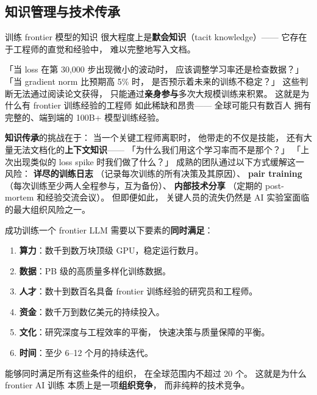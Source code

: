 \subsection{知识管理与技术传承}

训练 frontier 模型的知识
很大程度上是\textbf{默会知识}（tacit knowledge）——
它存在于工程师的直觉和经验中，
难以完整地写入文档。

「当 loss 在第 30,000 步出现微小的波动时，
应该调整学习率还是检查数据？」
「当 gradient norm 比预期高 5\% 时，
是否预示着未来的训练不稳定？」
这些判断无法通过阅读论文获得，
只能通过\textbf{亲身参与}多次大规模训练来积累。
这就是为什么有 frontier 训练经验的工程师
如此稀缺和昂贵——
全球可能只有数百人
拥有完整的、端到端的 100B+ 模型训练经验。

\textbf{知识传承}的挑战在于：
当一个关键工程师离职时，
他带走的不仅是技能，
还有大量无法文档化的\textbf{上下文知识}——
「为什么我们用这个学习率而不是那个？」
「上次出现类似的 loss spike 时我们做了什么？」
成熟的团队通过以下方式缓解这一风险：
\textbf{详尽的训练日志}
（记录每次训练的所有决策及其原因）、
\textbf{pair training}
（每次训练至少两人全程参与，互为备份）、
\textbf{内部技术分享}
（定期的 post-mortem 和经验交流会议）。
但即便如此，
关键人员的流失仍然是
AI 实验室面临的最大组织风险之一。

\begin{corebox}
成功训练一个 frontier LLM 需要以下要素的\textbf{同时满足}：
\begin{enumerate}[noitemsep]
  \item \textbf{算力}：数千到数万块顶级 GPU，稳定运行数月。
  \item \textbf{数据}：PB 级的高质量多样化训练数据。
  \item \textbf{人才}：数十到数百名具备
        frontier 训练经验的研究员和工程师。
  \item \textbf{资金}：数千万到数亿美元的持续投入。
  \item \textbf{文化}：研究深度与工程效率的平衡，
        快速决策与质量保障的平衡。
  \item \textbf{时间}：至少 6--12 个月的持续迭代。
\end{enumerate}
能够同时满足所有这些条件的组织，
在全球范围内不超过 20 个。
这就是为什么 frontier AI 训练
本质上是一项\textbf{组织竞争}，
而非纯粹的技术竞争。
\end{corebox}


